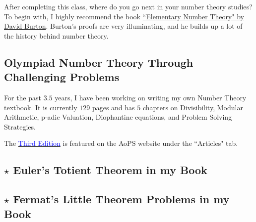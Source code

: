 After completing this class, where do you go next in your number theory studies? To begin with, I highly recommend the book \href{https://www.amazon.com/Elementary-Number-Theory-Paperback-Burton/dp/1259025764/ref=mt_paperback?_encoding=UTF8&me=}{``Elementary Number Theory" by David Burton}. Burton's proofs are very illuminating, and he builds up a lot of the history behind number theory.
\clearpage

\subsection{Olympiad Number Theory Through Challenging Problems}
For the past $3.5$ years, I have been working on writing my own Number Theory textbook. It is currently $129$ pages and has $5$ chapters on Divisibility, Modular Arithmetic, p-adic Valuation, Diophantine equations, and Problem Solving Strategies.

The \href{http://s3.amazonaws.com/aops-cdn.artofproblemsolving.com/resources/articles/olympiad-number-theory.pdf}{\textcolor{blue}{Third Edition}} is featured on the AoPS website under the ``Articles" tab. 
\subsection*{$\star$ Euler's Totient Theorem in my Book}

\subsection*{$\star$ Fermat's Little Theorem Problems in my Book}

